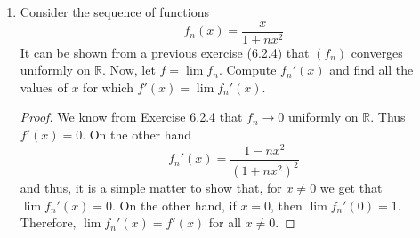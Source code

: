 \begin{enumerate}
    \begin{proof}
    \begin{enumerate}
        \item We claim \( g_n \rightarrow 0 \) uniformly on \( [0,1] \). To demonstrate, let \( \epsilon > 0 \) be given. If \( N > \frac{1}{\epsilon} \), then for all \( n \geq N \) and for all \( x \in [0,1] \), we have
        \[
        \left| \frac{x^n}{n} \right| = \frac{x^n}{n} \leq \frac{1}{n} < \epsilon
        \]
        therefore, \( g_n \rightarrow 0 \) on \( [0,1] \). Clearly \( g(x) = 0 \) is differentiable and \( g'(x) = 0 \) for all \( x \in [0,1] \).
        
        \item First, it is easy to see that
        \[
        g_n'(x) = x^n-1
        \]
        So, for \( x \in [0,1) \), we have
        \[
        \lim_{n \rightarrow \infty} x^{n-1} = 0
        \]
        and for \( x =1 \), we have
        \[
        \lim_{n \rightarrow \infty} x^{n-1} = 1
        \]
        Thus, if
        \[
        h(x) = \begin{cases} 0 & 0 \leq x < 1 \\ 1 & x = 1\end{cases}
        \]
        the \( g_n' \rightarrow h \) on \( [0,1] \). We see that \( (g_n') \) does not converge uniformly on \( [0,1] \) since each \( (g_n') \) is continuous at \( 1 \) while \( h \) is not. Furthermore, we see that \( h \neq g' \) since \( h(1) = 1 \) and \( g'(1) = 0 \). 
    \end{enumerate}
    \end{proof}
    
    \item Consider the sequence of functions
    \[
    f_n(x) = \frac{x}{1+nx^2}
    \]
    It can be shown from a previous exercise (6.2.4) that \( (f_n) \) converges uniformly on \( \mathbb{R} \). Now, let \( f = \lim f_n \). Compute \( f_n'(x) \) and find all the values of \( x \) for which \( f'(x) = \lim f_n'(x) \). 
    \begin{proof}
    We know from Exercise 6.2.4 that \( f_n \rightarrow 0 \) uniformly on \( \mathbb{R} \). Thus \( f'(x) = 0 \). On the other hand
    \[
    f_n'(x) = \frac{1-nx^2}{(1+nx^2)^2}
    \]
    and thus, it is a simple matter to show that, for \( x \neq 0 \) we get that \( \lim f_n'(x) = 0 \). On the other hand, if \( x = 0 \), then \( \lim f_n'(0) = 1 \). Therefore, \( \lim f_n'(x) = f'(x) \) for all \( x \neq 0 \). 
    \end{proof}
    

\end{enumerate}
